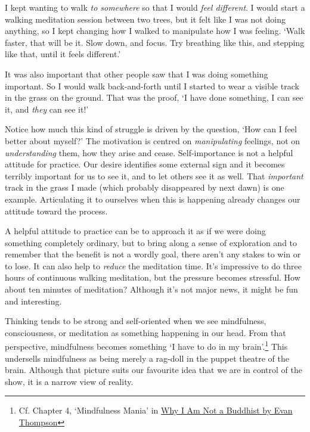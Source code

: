 I kept wanting to walk \emph{to somewhere} so that I would \emph{feel
different}. I would start a walking meditation session between two
trees, but it felt like I was not doing anything, so I kept changing how
I walked to manipulate how I was feeling. `Walk faster, that will be it.
Slow down, and focus. Try breathing like this, and stepping like that,
until it feels different.'

It was also important that other people saw that I was doing something
important. So I would walk back-and-forth until I started to wear a
visible track in the grass on the ground. That was the proof, `I have
done something, I can see it, and \emph{they} can see it!'

Notice how much this kind of struggle is driven by the question, `How
can I feel better about myself?' The motivation is centred on
\emph{manipulating} feelings, not on \emph{understanding} them, how they
arise and cease. Self-importance is not a helpful attitude for practice.
Our desire identifies some external sign and it becomes terribly
important for us to see it, and to let others see it as well. That
\emph{important} track in the grass I made (which probably disappeared
by next dawn) is one example. Articulating it to ourselves when this is
happening already changes our attitude toward the process.

A helpful attitude to practice can be to approach it as if we were doing
something completely ordinary, but to bring along a sense of exploration
and to remember that the benefit is not a wordly goal, there aren't any
stakes to win or to lose. It can also help to \emph{reduce} the
meditation time. It's impressive to do three hours of continuous walking
meditation, but the pressure becomes stressful. How about ten minutes of
meditation? Although it's not major news, it might be fun and
interesting.


Thinking tends to be strong and self-oriented when we see mindfulness,
consciousness, or meditation as something happening in our head. From
that perspective, mindfulness becomes something `I have to do in my
brain'.\footnote{Cf. Chapter 4, `Mindfulness Mania' in
  \href{https://www.goodreads.com/book/show/44439993-why-i-am-not-a-buddhist}{Why
  I Am Not a Buddhist by Evan Thompson}} This undersells mindfulness as
being merely a rag-doll in the puppet theatre of the brain. Although
that picture suits our favourite idea that we are in control of the
show, it is a narrow view of reality.

